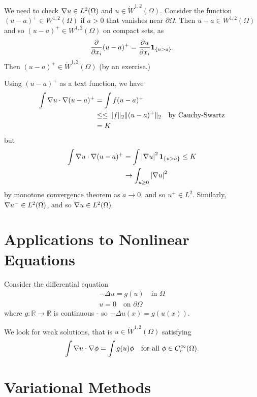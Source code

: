 \documentclass[10pt, oneside, reqno]{amsart}
\theoremstyle{plain}%
\numberwithin{equation}{section}
\theoremstyle{definition}
\theoremstyle{remark}
\newcommand{\R}{\mathbb{R}}
\begin{document}
We need to check $\nabla u \in L^2(\Omega)$ and $u \in \dot W^{1, 2}(\Omega)$.  Consider the function $(u-a)^+ \in W^{1, 2}(\Omega)$ if $a > 0$ that vanishes near $\partial \Omega$.  Then $u - a \in W^{1, 2}(\Omega)$ and so $(u-a)^+ \in W^{1,2}(\Omega)$ on compact sets, as \[
	\frac{\partial }{\partial x_i}(u-a)^+ = \frac{\partial u}{\partial x_i} \mathbf{1}_{\{ u > a \}}.
\]     Then $(u-a)^+ \in \dot W^{1, 2}(\Omega)$ (by an exercise.)

Using $(u-a)^+$ as a text function, we have \begin{align*}
	\int \nabla u \cdot \nabla (u-a)^+ &= \int f (u-a)^+  \\
									&\leq \leq \| f \|_2 \| (u-a)^+ \|_2 \quad \text{by Cauchy-Swartz} \\
									&= K
\end{align*} but \begin{align*}
	\int \nabla u \cdot \nabla (u-a)^+ &= \int \left| \nabla u \right|^2 \mathbf{1}_{\{ u > a \}} \leq K \\
		&\rightarrow \int_{u \geq 0} \left| \nabla u \right|^2
\end{align*} by monotone convergence theorem as $a \rightarrow 0$, and so $u^+ \in L^2$.  Similarly, $\nabla u^- \in L^2(\Omega)$, and so $\nabla u \in L^2(\Omega)$.



\section{Applications to Nonlinear Equations} %
\label{sec:applications_to_nonlinear_equations}
Consider the differential equation \begin{align*}
	-\Delta u = g(u) \quad \text{in $\Omega$} \\
	u = 0 \quad \text{on $\partial \Omega$}
\end{align*} where $g: \R \rightarrow \R$ is continuous - so $-\Delta u(x) = g(u(x))$.  

We look for weak solutions, that is $u \in \dot W^{1, 2}(\Omega)$ satisfying \begin{equation}
	\label{eq:his_eq_8.1}
	\int \nabla u \cdot \nabla \phi = \int g(u) \phi \quad \text{for all $\phi \in C^\infty_c(\Omega)$.}
\end{equation}

\section{Variational Methods} %
\label{sub:variational_methods}
\end{document}
